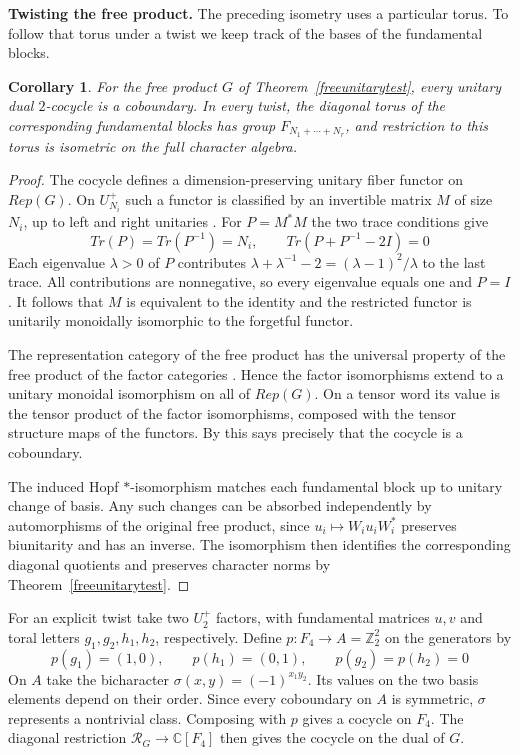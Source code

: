 \documentclass[11pt,a4paper]{article}
\newtheorem{cor}[thm]{Corollary}
\theoremstyle{remark}
\newcommand{\topic}[1]{\par\addvspace{1.0\baselineskip}\noindent\textbf{#1.}\enspace\ignorespaces}
\begin{document}
\topic{Twisting the free product}
The preceding isometry uses a particular torus. To follow that torus
under a twist we keep track of the bases of the fundamental blocks.

\begin{cor}\label{freetwist}
For the free product $G$ of Theorem~\ref{freeunitarytest}, every unitary
dual $2$-cocycle is a coboundary. In every twist, the diagonal torus of
the corresponding fundamental blocks has group $F_{N_1+\cdots+N_r}$,
and restriction to this torus is isometric on the full character algebra.
\end{cor}
\begin{proof}
The cocycle defines a dimension-preserving unitary fiber functor on
$Rep(G)$. On $U_{N_i}^+$ such a functor is classified
by an invertible matrix $M$ of size $N_i$, up to left and right
unitaries \cite[Theorem~6.2 and Remark~6.5]{bdv}. For $P=M^*M$ the two
trace conditions give
\[
 Tr(P)=Tr(P^{-1})=N_i,\qquad Tr(P+P^{-1}-2I)=0
\]
Each eigenvalue $\lambda>0$ of $P$ contributes
$\lambda+\lambda^{-1}-2=(\lambda-1)^2/\lambda$ to the last trace.
All contributions are nonnegative, so every eigenvalue equals one and $P=I$.
It follows that $M$ is equivalent to the identity and the restricted
functor is unitarily monoidally isomorphic to the forgetful functor.

The representation category of the free product has the universal
property of the free product of the factor categories
\cite[Proposition~5.1]{valvekens}. Hence the factor isomorphisms
extend to a unitary monoidal isomorphism on all of $Rep(G)$.
On a tensor word its value is the tensor product of the factor
isomorphisms, composed with the tensor structure maps of the functors.
By \cite[Proposition~4.5]{bdv} this says precisely that the cocycle
is a coboundary.

The induced Hopf $*$-isomorphism matches each fundamental block up to
unitary change of basis. Any such changes can be absorbed independently
by automorphisms of the original free product, since
$u_i\mapsto W_i u_i W_i^*$ preserves biunitarity and has an inverse.
The isomorphism then identifies the corresponding diagonal quotients
and preserves character norms by Theorem~\ref{freeunitarytest}.
\end{proof}

For an explicit twist take two $U_2^+$ factors, with fundamental
matrices $u,v$ and toral letters $g_1,g_2,h_1,h_2$, respectively.
Define $p:F_4\to A=\mathbb Z_2^2$ on the generators by
\[
 p(g_1)=(1,0),\qquad p(h_1)=(0,1),\qquad p(g_2)=p(h_2)=0
\]
On $A$ take the bicharacter $\sigma(x,y)=(-1)^{x_1y_2}$. Its values on
the two basis elements depend on their order. Since every coboundary on
$A$ is symmetric, $\sigma$ represents a nontrivial class. Composing
with $p$ gives a cocycle on $F_4$. The diagonal restriction
$\mathcal R_G\to\mathbb C[F_4]$ then gives the cocycle on
the dual of $G$.
\end{document}
